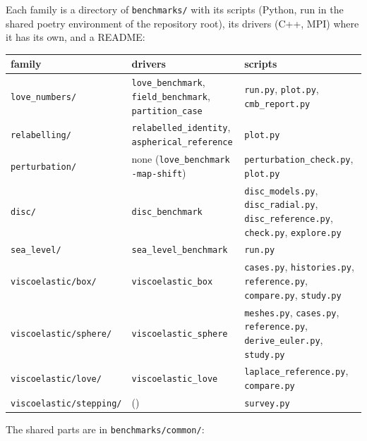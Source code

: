 \documentclass[11pt]{article}
\numberwithin{equation}{section}
\newcommand{\code}[1]{\texttt{#1}}
\begin{document}
Each family is a directory of \code{benchmarks/} with its scripts (Python,
run in the shared poetry environment of the repository root), its drivers (C++,
MPI) where it has its own, and a README:
\begin{center}
\small
\begin{tabular}{@{}lP{5.2cm}P{5.8cm}@{}}
\toprule
family & drivers & scripts \\
\midrule
\code{love\_numbers/} & \code{love\_benchmark}, \code{field\_benchmark}, \code{partition\_case} & \code{run.py}, \code{plot.py}, \code{cmb\_report.py} \\
\code{relabelling/} & \code{relabelled\_identity}, \code{aspherical\_reference} & \code{plot.py} \\
\code{perturbation/} & none (\code{love\_benchmark -map-shift}) & \code{perturbation\_check.py}, \code{plot.py} \\
\code{disc/} & \code{disc\_benchmark} & \code{disc\_models.py}, \code{disc\_radial.py}, \code{disc\_reference.py}, \code{check.py}, \code{explore.py} \\
\code{sea\_level/} & \code{sea\_level\_benchmark} & \code{run.py} \\
\code{viscoelastic/box/} & \code{viscoelastic\_box} & \code{cases.py}, \code{histories.py}, \code{reference.py}, \code{compare.py}, \code{study.py} \\
\code{viscoelastic/sphere/} & \code{viscoelastic\_sphere} & \code{meshes.py}, \code{cases.py}, \code{reference.py}, \code{derive\_euler.py}, \code{study.py} \\
\code{viscoelastic/love/} & \code{viscoelastic\_love} & \code{laplace\_reference.py}, \code{compare.py} \\
\code{viscoelastic/stepping/} & () & \code{survey.py} \\
\bottomrule
\end{tabular}
\end{center}
The shared parts are in \code{benchmarks/common/}:
\end{document}
